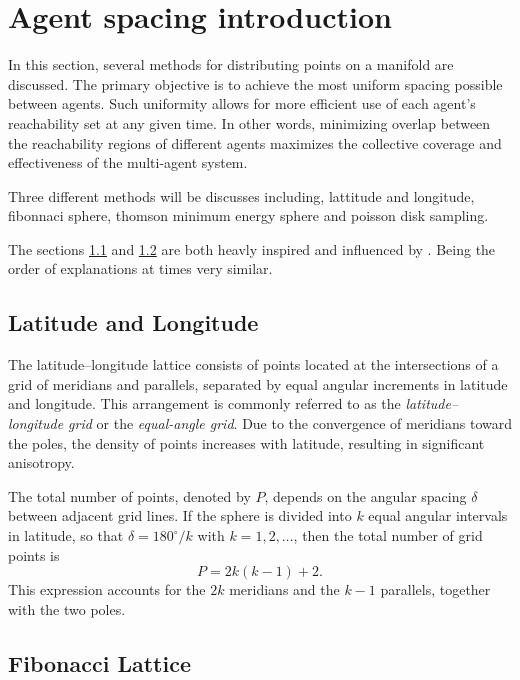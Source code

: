 \section{Agent spacing introduction} \label{sec.3:Agent spacing introduction}
In this section, several methods for distributing points on a manifold are discussed. The primary objective is to achieve the most uniform spacing possible between agents. Such uniformity allows for more efficient use of each agent's reachability set at any given time. In other words, minimizing overlap between the reachability regions of different agents maximizes the collective coverage and effectiveness of the multi-agent system.

Three different methods will be discusses including, lattitude and longitude, fibonnaci sphere, thomson minimum energy sphere and poisson disk sampling.

The sections \ref{sec.3:Latitude and longitude} and \ref{sec.3:Fibonacci Lattice} are both heavly inspired and influenced by \cite{Latitude_Longitude_vs_fibonacci}. Being the order of explanations at times very similar.

\subsection{Latitude and Longitude} \label{sec.3:Latitude and longitude}

The latitude--longitude lattice consists of points located at the intersections of a grid of meridians and parallels, separated by equal angular increments in latitude and longitude. This arrangement is commonly referred to as the \emph{latitude--longitude grid} or the \emph{equal-angle grid}. Due to the convergence of meridians toward the poles, the density of points increases with latitude, resulting in significant anisotropy.

The total number of points, denoted by $P$, depends on the angular spacing $\delta$ between adjacent grid lines. If the sphere is divided into $k$ equal angular intervals in latitude, so that $\delta = 180^\circ / k$ with $k = 1, 2, \ldots$, then the total number of grid points is
\begin{equation}
P = 2k(k - 1) + 2 .
\end{equation}
This expression accounts for the $2k$ meridians and the $k - 1$ parallels, together with the two poles.

\subsection{Fibonacci Lattice} \label{sec.3:Fibonacci Lattice}

